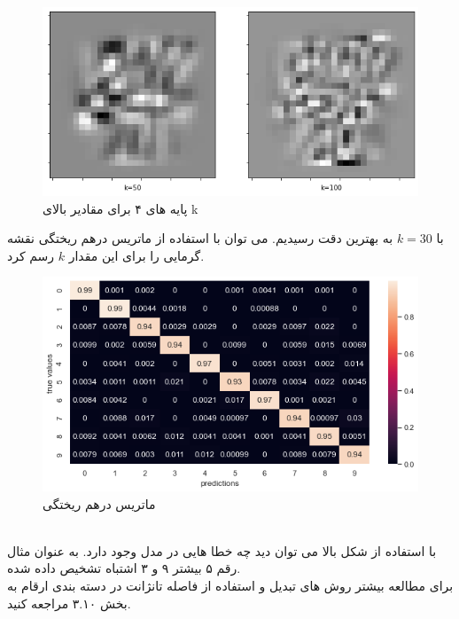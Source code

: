  	\begin{figure}[h]
 		\centering
 		\includegraphics[width=0.6\linewidth]{assets/4_base_k.png}
 		\caption{پایه های ۴ برای مقادیر بالای k}
 	\end{figure}
 	\pagebreak
 	با $ k=30 $ به بهترین دقت رسیدیم. می توان با استفاده از ماتریس درهم ریختگی  نقشه گرمایی را برای این مقدار $ k $ رسم کرد. \\
 	\begin{figure}[h]
 		\centering
 		\includegraphics[width=\linewidth]{assets/k=30.png}
 		\caption{ماتریس درهم ریختگی}
 	\end{figure}\\
 	با استفاده از شکل بالا می توان دید چه خطا هایی در مدل وجود دارد. به عنوان مثال رقم ۵ بیشتر ۹ و ۳ اشتباه تشخیص داده شده.\\
 	برای مطالعه بیشتر روش های تبدیل و استفاده از فاصله تانژانت  در دسته بندی ارقام به بخش ۳.۱۰ \cite{matrix_methods} مراجعه کنید.

	
